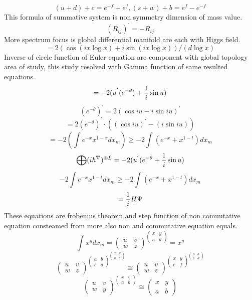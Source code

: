 \documentclass{jsarticle}
\begin{document}
  $$ (u + d) +c = e^{-f} + e^{f}, (s + w) + b = e^f - e^{-f} $$
     This formula of summative system is non symmetry dimension of mass value.
  $$ (R_{ij})^{'} = - R_{ij} $$
     More spectrum focus is global differential manifold are each with Higgs
  field.
  $$ = 2(\cos (i x \log x) + i \sin(i x \log x))/(d \log x) $$
     Inverse of circle function of Euler equation are component with 
  global topology area of study, this study resolved with Gamma function
  of same resulted equations.
  $$ = - 2 (u^{'}(e^{-\theta}) + {1 \over i}  \sin u)$$
  $$ (e^{-\theta})^{'} = 2(\cos i u - i \sin i u)^{'} $$
  $$ = 2(e^{- \theta})^{'}\cdot ((\cos i u)^{'} - (i \sin i u)) $$
  $$ = -2 (\int e^{-x}x^{1 - x}dx_m) \ge -2\int(e^{-x} + x^{1 - t})dx_m $$
  $$ \bigoplus (i \hbar^{\nabla})^{\oplus L} = - 2(u^{'}(e^{-\theta} + {1 \over
  i} \sin u) $$
  $$ -2 \int e^{-x} x^{1 - t}dx_m \ge - 2\int(e^{-x} + x^{1 - t})dx_m $$
  $$ = {1 \over i}H \Psi $$
     These equations are frobenius theorem and step function of non comuutative
  equation consteamed from more also non and commutative equation equals.
  $$ \int x^y dx_m = \begin{pmatrix} u & v \\
  w & z \end{pmatrix}^{\begin{pmatrix} x & y \\
  a & b \end{pmatrix}} = x^y  $$
  $$ \begin{pmatrix} u & v \\
  w & z \end{pmatrix}^{\begin{pmatrix}a & b \\
c & d \end{pmatrix}^{\begin{pmatrix}x & y \\
  a & b \end{pmatrix}}} \cong  \begin{pmatrix} u & v \\
  w & z \end{pmatrix}^{\begin{pmatrix} x & y \\
e & f \end{pmatrix}^{\begin{pmatrix} a & b \\
  c & d \end{pmatrix}}} $$
  $$ \begin{pmatrix} u & v \\
  w & y \end{pmatrix}^{\begin{pmatrix} x & v \\
a & b \end{pmatrix}} \cong \begin{pmatrix} x & y \\
  a & b \end{pmatrix} $$
\end{document}
